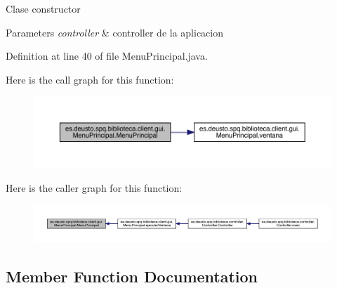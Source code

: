 Clase constructor 
\begin{DoxyParams}{Parameters}
{\em controller} & controller de la aplicacion \\
\hline
\end{DoxyParams}


Definition at line 40 of file Menu\+Principal.\+java.

Here is the call graph for this function\+:
\nopagebreak
\begin{figure}[H]
\begin{center}
\leavevmode
\includegraphics[width=350pt]{classes_1_1deusto_1_1spq_1_1biblioteca_1_1client_1_1gui_1_1_menu_principal_a5f5ca87246a3a113fcf053266649efd0_cgraph}
\end{center}
\end{figure}
Here is the caller graph for this function\+:
\nopagebreak
\begin{figure}[H]
\begin{center}
\leavevmode
\includegraphics[width=350pt]{classes_1_1deusto_1_1spq_1_1biblioteca_1_1client_1_1gui_1_1_menu_principal_a5f5ca87246a3a113fcf053266649efd0_icgraph}
\end{center}
\end{figure}


\subsection{Member Function Documentation}
\mbox{\label{classes_1_1deusto_1_1spq_1_1biblioteca_1_1client_1_1gui_1_1_menu_principal_a8f37cacc1f9ccc9b65f768d1cb5bc9c8}} 

